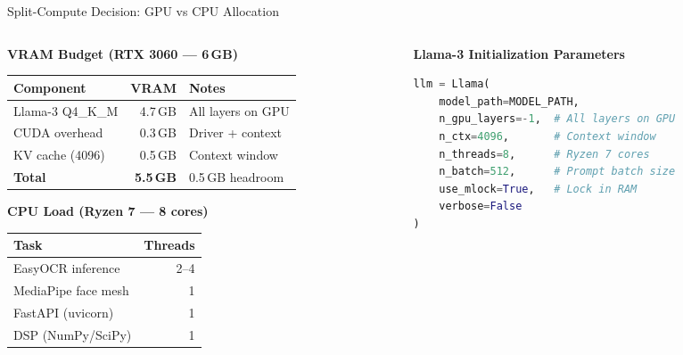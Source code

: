 \documentclass[aspectratio=169,10pt]{beamer}
\begin{document}
\begin{frame}{Split-Compute Decision: GPU vs CPU Allocation}
\begin{columns}[T]
\begin{column}{0.45\textwidth}
\textbf{VRAM Budget (RTX 3060 --- 6\,GB)}

\vspace{4pt}
\footnotesize
\begin{tabular}{@{}lrl@{}}
\toprule
\textbf{Component} & \textbf{VRAM} & \textbf{Notes} \\
\midrule
Llama-3 Q4\_K\_M & 4.7\,GB & All layers on GPU \\
CUDA overhead & 0.3\,GB & Driver + context \\
KV cache (4096) & 0.5\,GB & Context window \\
\midrule
\textbf{Total} & \textbf{5.5\,GB} & 0.5\,GB headroom \\
\bottomrule
\end{tabular}

\vspace{6pt}
\textbf{CPU Load (Ryzen 7 --- 8 cores)}

\vspace{4pt}
\begin{tabular}{@{}lr@{}}
\toprule
\textbf{Task} & \textbf{Threads} \\
\midrule
EasyOCR inference & 2--4 \\
MediaPipe face mesh & 1 \\
FastAPI (uvicorn) & 1 \\
DSP (NumPy/SciPy) & 1 \\
\bottomrule
\end{tabular}
\end{column}

\begin{column}{0.52\textwidth}
\textbf{Llama-3 Initialization Parameters}

\vspace{4pt}
\begin{lstlisting}[language=Python]
llm = Llama(
    model_path=MODEL_PATH,
    n_gpu_layers=-1,  # All layers on GPU
    n_ctx=4096,       # Context window
    n_threads=8,      # Ryzen 7 cores
    n_batch=512,      # Prompt batch size
    use_mlock=True,   # Lock in RAM
    verbose=False
)
\end{lstlisting}


\end{column}
\end{columns}
\end{frame}
\end{document}
